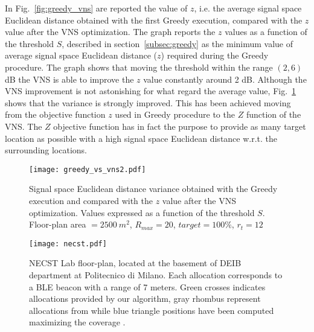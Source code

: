 In Fig.~\ref{fig:greedy_vns} are reported the value of $z$, i.e. the average signal space Euclidean distance obtained with the first Greedy execution, compared with the $z$ value after the VNS optimization. The graph reports the $z$ values as a function of the threshold $S$, described in section~\ref{subsec:greedy} as the minimum value of average signal space Euclidean distance ($z$) required during the Greedy procedure. The graph shows that moving the threshold within the range $(2,6)$dB the VNS is able to improve the $z$ value constantly around 2 dB.
Although the VNS improvement is not astonishing for what regard the average value, Fig.~\ref{fig:greedy_vns2} shows that the variance is strongly improved. This has been achieved moving from the objective function $z$ used in Greedy procedure to the $Z$ function of the VNS. The $Z$ objective function has in fact the purpose to provide as many target location as possible with a high signal space Euclidean distance w.r.t. the surrounding locations.

\begin{figure}[h!tb]
\centering\texttt{[image: greedy\_vs\_vns2.pdf]}
\caption{Signal space Euclidean distance variance obtained with the Greedy execution and compared with the $z$ value after the VNS optimization. Values expressed as a function of the threshold $S$. Floor-plan area $=2500~m^2$, $R_{max} = 20$, $target = 100\%$, $r_t=12$}
\label{fig:greedy_vns2}
\end{figure}

\begin{figure}
\centering\texttt{[image: necst.pdf]}
\caption[NECST Lab floor-plan used as indoor environment testbed for deployments evaluation.]{NECST Lab floor-plan, located at the basement of DEIB department at Politecnico di Milano. Each allocation corresponds to a BLE beacon with a range of 7 meters. Green crosses indicates allocations provided by our algorithm, gray rhombus represent allocations from \cite{He2011} while blue triangle positions have been computed maximizing the coverage \cite{Kouakou2010a}.}
\label{fig:necst}
\end{figure}

